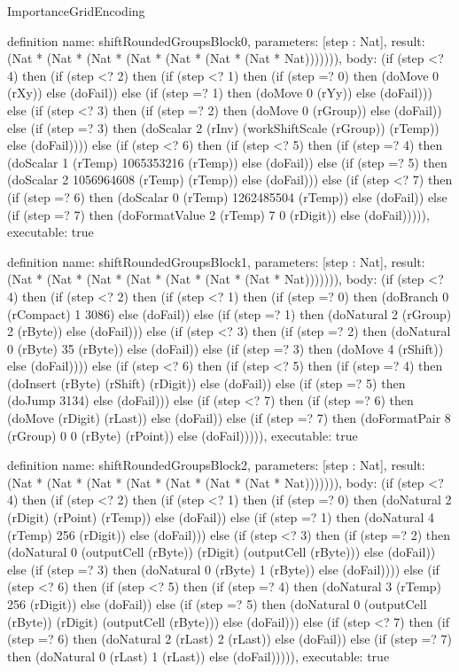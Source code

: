 \begin{lexlean}{ImportanceGridEncoding}
\begin{semanticmodule}
definition{
  name: shiftRoundedGroupsBlock0,
  parameters: [step : Nat],
  result: (Nat * (Nat * (Nat * (Nat * (Nat * (Nat * (Nat * Nat))))))),
  body: (if (step <? 4) then
      (if (step <? 2) then
      (if (step <? 1) then
      (if (step =? 0) then (doMove 0 (rXy)) else (doFail)) else
      (if (step =? 1) then (doMove 0 (rYy)) else (doFail))) else
      (if (step <? 3) then
      (if (step =? 2) then (doMove 0 (rGroup)) else (doFail)) else
      (if (step =? 3) then (doScalar 2 (rInv) (workShiftScale (rGroup)) (rTemp)) else (doFail)))) else
      (if (step <? 6) then
      (if (step <? 5) then
      (if (step =? 4) then (doScalar 1 (rTemp) 1065353216 (rTemp)) else (doFail)) else
      (if (step =? 5) then (doScalar 2 1056964608 (rTemp) (rTemp)) else (doFail))) else
      (if (step <? 7) then
      (if (step =? 6) then (doScalar 0 (rTemp) 1262485504 (rTemp)) else (doFail)) else
      (if (step =? 7) then (doFormatValue 2 (rTemp) 7 0 (rDigit)) else (doFail))))),
  executable: true
}

definition{
  name: shiftRoundedGroupsBlock1,
  parameters: [step : Nat],
  result: (Nat * (Nat * (Nat * (Nat * (Nat * (Nat * (Nat * Nat))))))),
  body: (if (step <? 4) then
      (if (step <? 2) then
      (if (step <? 1) then
      (if (step =? 0) then (doBranch 0 (rCompact) 1 3086) else (doFail)) else
      (if (step =? 1) then (doNatural 2 (rGroup) 2 (rByte)) else (doFail))) else
      (if (step <? 3) then
      (if (step =? 2) then (doNatural 0 (rByte) 35 (rByte)) else (doFail)) else
      (if (step =? 3) then (doMove 4 (rShift)) else (doFail)))) else
      (if (step <? 6) then
      (if (step <? 5) then
      (if (step =? 4) then (doInsert (rByte) (rShift) (rDigit)) else (doFail)) else
      (if (step =? 5) then (doJump 3134) else (doFail))) else
      (if (step <? 7) then
      (if (step =? 6) then (doMove (rDigit) (rLast)) else (doFail)) else
      (if (step =? 7) then (doFormatPair 8 (rGroup) 0 0 (rByte) (rPoint)) else (doFail))))),
  executable: true
}

definition{
  name: shiftRoundedGroupsBlock2,
  parameters: [step : Nat],
  result: (Nat * (Nat * (Nat * (Nat * (Nat * (Nat * (Nat * Nat))))))),
  body: (if (step <? 4) then
      (if (step <? 2) then
      (if (step <? 1) then
      (if (step =? 0) then (doNatural 2 (rDigit) (rPoint) (rTemp)) else (doFail)) else
      (if (step =? 1) then (doNatural 4 (rTemp) 256 (rDigit)) else (doFail))) else
      (if (step <? 3) then
      (if (step =? 2) then (doNatural 0 (outputCell (rByte)) (rDigit) (outputCell (rByte))) else (doFail)) else
      (if (step =? 3) then (doNatural 0 (rByte) 1 (rByte)) else (doFail)))) else
      (if (step <? 6) then
      (if (step <? 5) then
      (if (step =? 4) then (doNatural 3 (rTemp) 256 (rDigit)) else (doFail)) else
      (if (step =? 5) then (doNatural 0 (outputCell (rByte)) (rDigit) (outputCell (rByte))) else (doFail))) else
      (if (step <? 7) then
      (if (step =? 6) then (doNatural 2 (rLast) 2 (rLast)) else (doFail)) else
      (if (step =? 7) then (doNatural 0 (rLast) 1 (rLast)) else (doFail))))),
  executable: true
}


\end{semanticmodule}
\end{lexlean}
